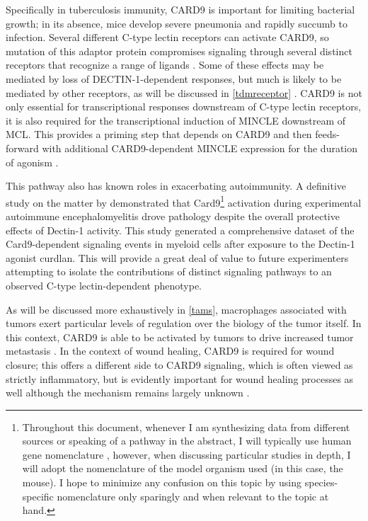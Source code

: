 Specifically in tuberculosis immunity, CARD9 is important for limiting bacterial growth; in its absence, mice develop severe pneumonia and rapidly succumb to infection. Several different C\hyp{}type lectin receptors can activate CARD9, so mutation of this adaptor protein compromises signaling through several distinct receptors that recognize a range of ligands \citep{Wagener2018}. Some of these effects may be mediated by loss of DECTIN\hyp{}1\hyp{}dependent responses, but much is likely to be mediated by other receptors, as will be discussed in \autoref{tdmreceptor} \citep{Marakalala2010, Marakalala2017}. CARD9 is not only essential for transcriptional responses downstream of C\hyp{}type lectin receptors, it is also required for the transcriptional induction of MINCLE downstream of MCL. This provides a priming step that depends on CARD9 and then feeds\hyp{}forward with additional CARD9\hyp{}dependent MINCLE expression for the duration of agonism \citep{Zhao2014}.

This pathway also has known roles in exacerbating autoimmunity. A definitive study on the matter by \citet{Deerhake2021} demonstrated that Card9\footnote{Throughout this document, whenever I am synthesizing data from different sources or speaking of a pathway in the abstract, I will typically use human gene nomenclature \citep{Tweedie2021}, however, when discussing particular studies in depth, I will adopt the nomenclature of the model organism used (in this case, the mouse). I hope to minimize any confusion on this topic by using species-specific nomenclature only sparingly and when relevant to the topic at hand.} activation during experimental autoimmune encephalomyelitis drove pathology despite the overall protective effects of Dectin\hyp{}1 activity. This study generated a comprehensive dataset of the Card9\hyp{}dependent signaling events in myeloid cells after exposure to the Dectin\hyp{}1 agonist curdlan. This will provide a great deal of value to future experimenters attempting to isolate the contributions of distinct signaling pathways to an observed C\hyp{}type lectin\hyp{}dependent phenotype.

As will be discussed more exhaustively in \autoref{tams}, macrophages associated with tumors exert particular levels of regulation over the biology of the tumor itself. In this context, CARD9 is able to be activated by tumors to drive increased tumor metastasis \citep{Yang2014b}. In the context of wound healing, CARD9 is required for wound closure; this offers a different side to CARD9 signaling, which is often viewed as strictly inflammatory, but is evidently important for wound healing processes as well although the mechanism remains largely unknown \citep{Kanno2017}.

